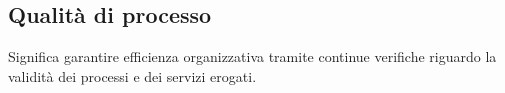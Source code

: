\section{}
\subsection*{Qualità di processo} Significa garantire efficienza organizzativa tramite continue verifiche riguardo la validità dei processi e dei servizi erogati.

\newpage